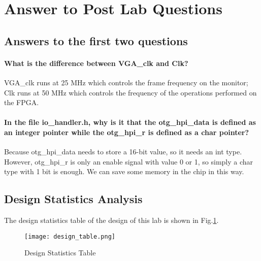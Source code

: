 \documentclass[11pt]{article}
\begin{document}
\section{Answer to Post Lab Questions}
\subsection{Answers to the first two questions}
\paragraph{What is the difference between VGA\_clk and Clk?}
VGA\_clk runs at 25 MHz which controls the frame frequency on the monitor; Clk runs at 50 MHz which controls the frequency of the operations performed on the FPGA.

\paragraph{In the file io\_handler.h, why is it that the otg\_hpi\_data is defined as an integer pointer while the otg\_hpi\_r is defined as a char pointer?}
Because otg\_hpi\_data needs to store a 16-bit value, so it needs an int type. However, otg\_hpi\_r is only an enable signal with value 0 or 1, so simply a char type with 1 bit is enough. We can save some memory in the chip in this way.

\subsection{Design Statistics Analysis}
The design statistics table of the design of this lab is shown in Fig.\ref{6_3}.
\begin{figure}[h]
    \centering
    \texttt{[image: design\_table.png]}
    \caption{Design Statistics Table}
    \label{6_3}
\end{figure}

\end{document}
